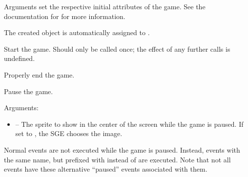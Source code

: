 \documentclass[letterpaper,10pt,english]{sphinxmanual}
\begin{document}
\begin{fulllineitems}
\label{dsp:sge.dsp.Game.__init__}
Arguments set the respective initial attributes of the game.
See the documentation for {\hyperref[dsp:sge.dsp.Game]{\emph{}}} for more
information.

The created {\hyperref[dsp:sge.dsp.Game]{\emph{}}} object is automatically
assigned to .

\end{fulllineitems}


\begin{fulllineitems}
\label{dsp:sge.dsp.Game.start}
Start the game.  Should only be called once; the effect of any
further calls is undefined.

\end{fulllineitems}


\begin{fulllineitems}
\label{dsp:sge.dsp.Game.end}
Properly end the game.

\end{fulllineitems}


\begin{fulllineitems}
\label{dsp:sge.dsp.Game.pause}
Pause the game.

Arguments:
\begin{itemize}
\item {} 
 -- The sprite to show in the center of the screen
while the game is paused.  If set to , the SGE
chooses the image.

\end{itemize}

Normal events are not executed while the game is paused.
Instead, events with the same name, but prefixed with
 instead of  are executed.  Note that
not all events have these alternative ``paused'' events associated
with them.

\end{fulllineitems}
\end{document}
